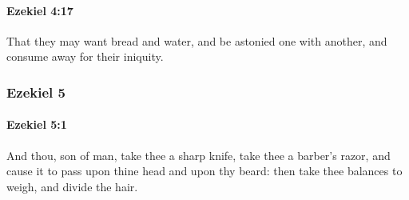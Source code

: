 		\paragraph{Ezekiel 4:17} %
			\label{EZEKIEL-4-17}

			That they may want bread and water, and be astonied one with another, and consume away for their iniquity.

	\subsubsection{Ezekiel 5} %
		\label{EZEKIEL-5}

		\paragraph{Ezekiel 5:1} %
			\label{EZEKIEL-5-1}

			And thou, son of man, take thee a sharp knife, take thee a barber’s razor, and cause it to pass upon thine head and upon thy beard: then take thee balances to weigh, and divide the hair.

